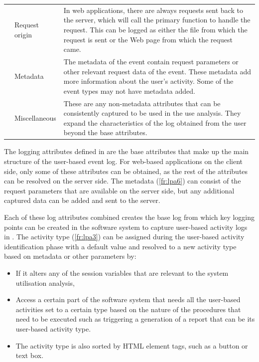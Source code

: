\begin{xltabular}{\textwidth}{llX}
     & Request origin & In web applications, there are always requests sent back to the server, which will call the primary function to handle the request. This can be logged as either the file from which the request is sent or the Web page from which the request came. \\ 

         & Metadata & The metadata of the event contain request parameters or other relevant request data of the event. These metadata add more information about the user's activity. Some of the event types may not have metadata added. \\

     & Miscellaneous & These are any non-metadata attributes that can be consistently captured to be used in the use analysis. They expand the characteristics of the log obtained from the user beyond the base attributes. \\ 
    \bottomrule
\end{xltabular}

The logging attributes defined in  are the base attributes that make up the main structure of the user-based event log. For web-based applications on the client side, only some of these attributes can be obtained, as the rest of the attributes can be resolved on the server side. The metadata (\ref{fr:lpa6}) can consist of the request parameters that are available on the server side, but any additional captured data can be added and sent to the server. \par Each of these log attributes combined creates the base log from which key logging points can be created in the software system to capture user-based activity logs in . The activity type (\ref{fr:lpa3}) can be assigned during the user-based activity identification phase with a default value and resolved to a new activity type based on metadata or other parameters by:

\begin{itemize}
	\item If it alters any of the session variables that are relevant to the system utilisation analysis,
	\item Access a certain part of the software system that needs all the user-based activities set to a certain type based on the nature of the procedures that need to be executed such as triggering a generation of a report that can be its user-based activity type.
	\item The activity type is also sorted by HTML element tags, such as a button or text box.
\end{itemize}

